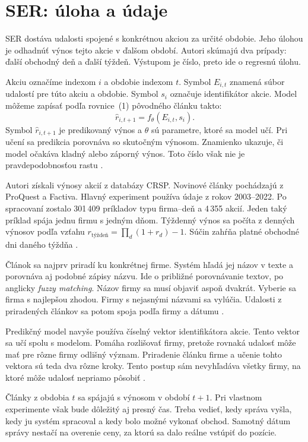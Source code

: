 \section{SER: úloha a údaje}
SER dostáva udalosti spojené s konkrétnou akciou za určité obdobie. Jeho úlohou je odhadnúť výnos tejto akcie v ďalšom období. Autori skúmajú dva prípady: ďalší obchodný deň a ďalší týždeň. Výstupom je číslo, preto ide o regresnú úlohu.

Akciu označíme indexom $i$ a obdobie indexom $t$. Symbol $E_{i,t}$ znamená súbor udalostí pre túto akciu a obdobie. Symbol $s_i$ označuje identifikátor akcie. Model môžeme zapísať podľa rovnice~(1) pôvodného článku takto:
\begin{equation}
\widehat r_{i,t+1}=f_{\theta}(E_{i,t},s_i).
\label{eq:task}
\end{equation}
Symbol $\widehat r_{i,t+1}$ je predikovaný výnos a $\theta$ sú parametre, ktoré sa model učí. Pri učení sa predikcia porovnáva so skutočným výnosom. Znamienko ukazuje, či model očakáva kladný alebo záporný výnos. Toto číslo však nie je pravdepodobnosťou rastu .

Autori získali výnosy akcií z databázy CRSP. Novinové články pochádzajú z ProQuest a Factiva. Hlavný experiment používa údaje z rokov 2003--2022. Po spracovaní zostalo 301\,409 príkladov typu firma--deň a 4\,355 akcií. Jeden taký príklad spája jednu firmu s jedným dňom. Týždenný výnos sa počíta z denných výnosov podľa vzťahu $r_{\text{týždeň}}=\prod_d(1+r_d)-1$. Súčin zahŕňa platné obchodné dni daného týždňa .

Článok sa najprv priradí ku konkrétnej firme. Systém hľadá jej názov v texte a porovnáva aj podobné zápisy názvu. Ide o približné porovnávanie textov, po anglicky \emph{fuzzy matching}. Názov firmy sa musí objaviť aspoň dvakrát. Vyberie sa firma s najlepšou zhodou. Firmy s nejasnými názvami sa vylúčia. Udalosti z priradených článkov sa potom spoja podľa firmy a dátumu .

Predikčný model navyše používa číselný vektor identifikátora akcie. Tento vektor sa učí spolu s modelom. Pomáha rozlišovať firmy, pretože rovnaká udalosť môže mať pre rôzne firmy odlišný význam. Priradenie článku firme a učenie tohto vektora sú teda dva rôzne kroky. Tento postup sám nevyhľadáva všetky firmy, na ktoré môže udalosť nepriamo pôsobiť .

Články z obdobia $t$ sa spájajú s výnosom v období $t+1$. Pri vlastnom experimente však bude dôležitý aj presný čas. Treba vedieť, kedy správa vyšla, kedy ju systém spracoval a kedy bolo možné vykonať obchod. Samotný dátum správy nestačí na overenie ceny, za ktorú sa dalo reálne vstúpiť do pozície.

